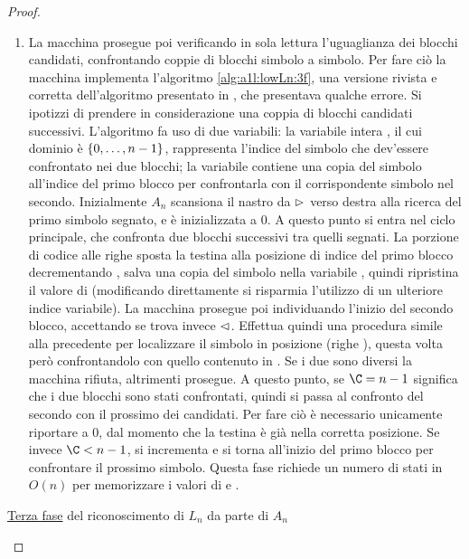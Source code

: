 \begin{proof}
\begin{enumerate}
		\item \label{itm:a1l:lowLn:LA3} La macchina prosegue poi verificando in sola lettura l'uguaglianza dei blocchi candidati, confrontando coppie di blocchi simbolo a simbolo. Per fare ciò la macchina implementa l'algoritmo \ref{alg:a1l:lowLn:3f}, una versione rivista e corretta dell'algoritmo presentato in \cite{Pighizzini:14:limitedRE}, che presentava qualche errore. Si ipotizzi di prendere in considerazione una coppia di blocchi candidati successivi. L'algoritmo fa uso di due variabili: la variabile intera \C, il cui dominio è $\left\{ 0,\dots,n-1 \right\}$, rappresenta l'indice del simbolo che dev'essere confrontato nei due blocchi; la variabile \B contiene una copia del simbolo all'indice \C del primo blocco per confrontarla con il corrispondente simbolo nel secondo. Inizialmente $A_n$ scansiona il nastro da $\rhd$ verso destra alla ricerca del primo simbolo segnato, e \C è inizializzata a $0$. A questo punto si entra nel ciclo principale, che confronta due blocchi successivi tra quelli segnati. La porzione di codice alle righe  sposta la testina alla posizione di indice \C del primo blocco decrementando \C, salva una copia del simbolo nella variabile \B, quindi ripristina il valore di \C (modificando direttamente \C si risparmia l'utilizzo di un ulteriore indice variabile). La macchina prosegue poi individuando l'inizio del secondo blocco, accettando se trova invece $\lhd$. Effettua quindi una procedura simile alla precedente per localizzare il simbolo in posizione \C (righe ), questa volta però confrontandolo con quello contenuto in \B. Se i due sono diversi la macchina rifiuta, altrimenti prosegue. A questo punto, se $\C=n-1$ significa che i due blocchi sono stati confrontati, quindi si passa al confronto del secondo con il prossimo dei candidati. Per fare ciò è necessario unicamente riportare \C a $0$, dal momento che la testina è già nella corretta posizione. Se invece $\C<n-1$, si incrementa \C e si torna all'inizio del primo blocco per confrontare il prossimo simbolo. Questa fase richiede un numero di stati in $O(n)$ per memorizzare i valori di \B e \C.
	\end{enumerate}

	\IncMargin{1em}
	\begin{algorithm}
		
		\caption{\hyperref[itm:a1l:lowLn:LA3]{Terza fase} del riconoscimento di $L_n$ da parte di $A_n$}
		\label{alg:a1l:lowLn:3f}
	\end{algorithm}
	\DecMargin{1em}
\end{proof}

